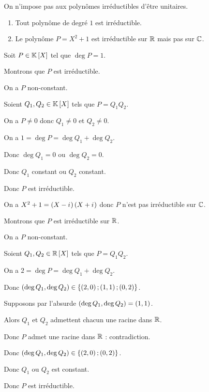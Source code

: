 \begin{rem}
On n'impose pas aux polynômes irréductibles d'être unitaires.
\end{rem}

\begin{ex}
\begin{enumerate}
\item Tout polynôme de degré \(1\) est irréductible. \\

\item Le polynôme \(P=X^2+1\) est irréductible sur \(\mathbb{R}\) mais pas sur \(\mathbb{C}\).
\end{enumerate}
\end{ex}

\begin{dem}[1]
Soit \(P\in\poly\) tel que \(\deg P=1\).

Montrons que \(P\) est irréductible.

On a \(P\) non-constant.

Soient \(Q_1,Q_2\in\poly\) tels que \(P=Q_1Q_2\).

On a \(P\not=0\) donc \(Q_1\not=0\) et \(Q_2\not=0\).

On a \(1=\deg P=\deg Q_1+\deg Q_2\).

Donc \(\deg Q_1=0\) ou \(\deg Q_2=0\).

Donc \(Q_1\) constant ou \(Q_2\) constant.

Donc \(P\) est irréductible.
\end{dem}

\begin{dem}[2]
On a \(X^2+1=\left(X-i\mkern1mu\right)\left(X+i\mkern1mu\right)\) donc \(P\) n'est pas irréductible sur \(\mathbb{C}\).

Montrons que \(P\) est irréductible sur \(\mathbb{R}\).

On a \(P\) non-constant.

Soient \(Q_1,Q_2\in\poly[\R]\) tels que \(P=Q_1Q_2\).

On a \(2=\deg P=\deg Q_1+\deg Q_2\).

Donc \(\left(\deg Q_1,\deg Q_2\right)\in\left\lbrace\left(2,0\right);\left(1,1\right);\left(0,2\right)\right\rbrace\).

Supposons par l'absurde \(\left(\deg Q_1,\deg Q_2\right)=\left(1,1\right)\).

Alors \(Q_1\) et \(Q_2\) admettent chacun une racine dans \(\mathbb{R}\).

Donc \(P\) admet une racine dans \(\mathbb{R}\) : contradiction.

Donc \(\left(\deg Q_1,\deg Q_2\right)\in\left\lbrace\left(2,0\right);\left(0,2\right)\right\rbrace\).

Donc \(Q_1\) ou \(Q_2\) est constant.

Donc \(P\) est irréductible.
\end{dem}

